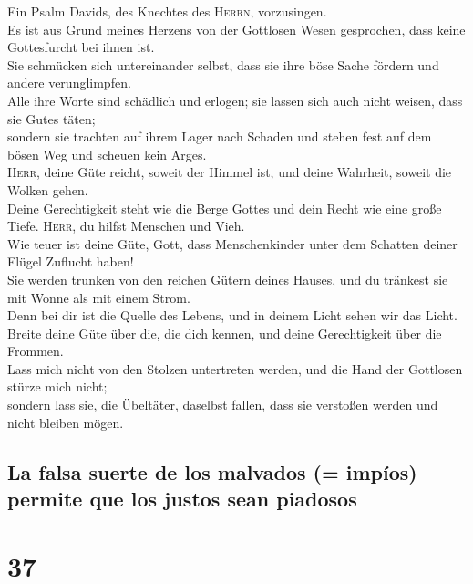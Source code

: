  Ein Psalm Davids, des Knechtes des \textsc{Herrn},
vorzusingen.\\
 Es ist aus Grund meines Herzens von der Gottlosen Wesen
gesprochen, dass keine Gottesfurcht bei ihnen ist.\\
 Sie schmücken sich untereinander selbst, dass sie ihre
böse Sache fördern und andere verunglimpfen.\\
 Alle ihre Worte sind schädlich und erlogen; sie lassen
sich auch nicht weisen, dass sie Gutes täten;\\
 sondern sie trachten auf ihrem Lager nach Schaden und
stehen fest auf dem bösen Weg und scheuen kein Arges.\\
 \textsc{Herr}, deine Güte reicht, soweit der Himmel ist,
und deine Wahrheit, soweit die Wolken gehen.\\
 Deine Gerechtigkeit steht wie die Berge Gottes und dein
Recht wie eine große Tiefe. \textsc{Herr}, du hilfst Menschen und
Vieh.\\
 Wie teuer ist deine Güte, Gott, dass Menschenkinder unter
dem Schatten deiner Flügel Zuflucht haben!\\
 Sie werden trunken von den reichen Gütern deines Hauses,
und du tränkest sie mit Wonne als mit einem Strom.\\
 Denn bei dir ist die Quelle des Lebens, und in deinem
Licht sehen wir das Licht.\\
 Breite deine Güte über die, die dich kennen, und deine
Gerechtigkeit über die Frommen.\\
 Lass mich nicht von den Stolzen untertreten werden, und
die Hand der Gottlosen stürze mich nicht;\\
 sondern lass sie, die Übeltäter, daselbst fallen, dass
sie verstoßen werden und nicht bleiben mögen.

\hypertarget{la-falsa-suerte-de-los-malvados-impuxedos-permite-que-los-justos-sean-piadosos}{%
\subsection{La falsa suerte de los malvados (= impíos) permite que los
justos sean
piadosos}\label{la-falsa-suerte-de-los-malvados-impuxedos-permite-que-los-justos-sean-piadosos}}

\hypertarget{section-36}{%
\section{37}\label{section-36}}

